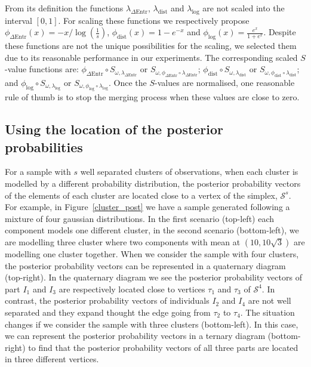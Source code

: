 \documentclass[submit]{smj}
\theoremstyle{definition}
\begin{document}
From its definition the functions $\lambda_{\Delta\text{Entr}}$, $\lambda_{\text{dist}}$ and 
$\lambda_{\log}$ are not scaled into the interval $\left[0,1\right]$. For scaling these functions we respectively propose  $\phi_{\Delta\text{Entr}}(x) = -x/{\log(\frac{1}{s})}$, $\phi_{\text{dist}}(x) = 1-e^{-x}$ and $\phi_{\log}(x) = \frac{e^x}{1+e^x}$. Despite these functions are not the unique possibilities for the scaling, we selected them due to its reasonable performance in our experiments. The corresponding scaled $S$-value functions are: 
  $\phi_{\Delta\text{Entr}} \circ S_{\omega, \lambda_{\Delta\text{Entr}}}$ or $S_{\omega, \phi_{\Delta\text{Entr}} \circ \lambda_{\Delta\text{Entr}}}$; $\phi_{\text{dist}} \circ S_{\omega, \lambda_{\text{dist}}}$ or $S_{\omega, \phi_{\text{dist}} \circ \lambda_{\text{dist}}}$; and $\phi_{\log} \circ S_{\omega, \lambda_{\log}}$ or $S_{\omega, \phi_{\log} \circ \lambda_{\log}}$. Once the $S$-values are normalised, one reasonable rule of thumb is to stop the merging process when these values are close to zero.

\subsection{Using the location of the posterior probabilities}\label{coda_clusters}

For a sample with $s$ well separated clusters of observations, when each cluster is modelled by a different probability distribution, the posterior probability vectors of the elements of each cluster are located close to a vertex of the simplex, $\mathcal{S}^s$. For example, in Figure~\ref{cluster_post} we have a sample generated following a mixture of four gaussian distributions. In the first scenario (top-left) each component models one different cluster, in the second scenario (bottom-left), we are modelling three cluster where two components with mean at $(10, 10 \sqrt{3})$ are modelling one cluster together. When we consider the sample with four clusters, the posterior probability vectors can be represented in a quaternary diagram (top-right). In the quaternary diagram we see the posterior probability vectors of part $I_1$ and $I_3$ are respectively located close to vertices $\tau_1$ and $\tau_3$ of $\mathcal{S}^4$. In contrast, the posterior probability vectors of individuals $I_2$ and $I_4$ are not well separated and they expand thought the edge going from $\tau_2$ to $\tau_4$. The situation changes if we consider the sample with three clusters (bottom-left). In this case, we can represent the posterior probability vectors in a ternary diagram (bottom-right) to find that the posterior probability vectors of all three parts are located in three different vertices.
\end{document}
